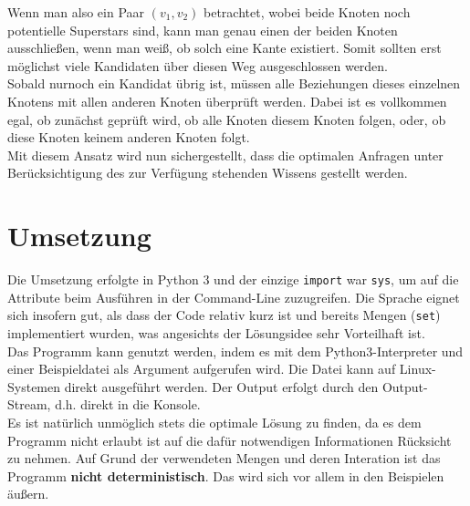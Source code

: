 \documentclass[a4paper,10pt,ngerman]{scrartcl}
\begin{document}
Wenn man also ein Paar $(v_1, v_2)$ betrachtet, wobei beide Knoten noch potentielle
Superstars sind, kann man genau einen der beiden Knoten ausschlie\ss en, wenn man wei\ss,
ob solch eine Kante existiert. Somit sollten erst m\"oglichst viele Kandidaten \"uber diesen
Weg ausgeschlossen werden.\\
\indent Sobald nurnoch ein Kandidat \"ubrig ist, m\"ussen alle Beziehungen dieses einzelnen
Knotens mit allen anderen Knoten \"uberpr\"uft werden. Dabei ist es vollkommen egal, ob
zun\"achst gepr\"uft wird, ob alle Knoten diesem Knoten folgen, oder, ob diese Knoten keinem 
anderen Knoten folgt.\\
\indent Mit diesem Ansatz wird nun sichergestellt, dass die optimalen Anfragen unter
Ber\"ucksichtigung des zur Verf\"ugung stehenden Wissens gestellt werden.
\section{Umsetzung}
Die Umsetzung erfolgte in Python 3 und der einzige \texttt{import} war \texttt{sys}, um
auf die Attribute beim Ausf\"uhren in der Command-Line zuzugreifen. Die Sprache eignet
sich insofern gut, als dass der Code relativ kurz ist und bereits Mengen
(\texttt{set}) implementiert
wurden, was angesichts der L\"osungsidee sehr Vorteilhaft ist.\\
\indent Das Programm kann genutzt werden, indem es mit dem Python3-Interpreter und einer
Beispieldatei als Argument aufgerufen wird. Die Datei kann auf Linux-Systemen direkt
ausgef\"uhrt werden. Der Output erfolgt durch den Output-Stream, d.h. direkt in die 
Konsole.\\
\indent Es ist nat\"urlich unm\"oglich stets die optimale L\"osung zu finden, da es dem
Programm nicht erlaubt ist auf die daf\"ur notwendigen Informationen R\"ucksicht zu
nehmen. Auf Grund der verwendeten Mengen und deren Interation ist das Programm 
\textbf{nicht deterministisch}. Das wird sich vor allem in den Beispielen \"au\ss ern.
\end{document}
